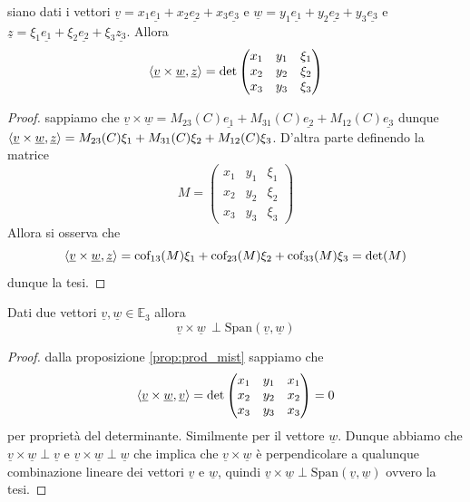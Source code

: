 %
%
\vspace{0.5cm}
\begin{prop}[\textcolor{blue}{matrice del prodotto misto}]
siano dati i vettori $\underline{v}=x_1 \underline{e_1} + x_2 \underline{e_2} + x_3 \underline{e_3}$ e $\underline{w} = y_1 \underline{e_1} + y_2 \underline{e_2} + y_3 \underline{e_3}$ e $\underline{z} = \xi_1 \underline{e_1} + \xi_2 \underline{e_2} + \xi_3 \underline{z_3}$. Allora
%
\begin{equation*}
\langle \underline{v} \times \underline{w}, \underline{z} \rangle 
= \text{det}\begin{pmatrix}
	x_1 & y_1 & \xi_1 \\
	x_2 & y_2 & \xi_2 \\
	x_3 & y_3 & \xi_3
\end{pmatrix}
\end{equation*}
\label{prop:prod_mist}
\end{prop}
%
%
\begin{proof}
	sappiamo che $\underline{v} \times \underline{w} = M_{23}(C)\underline{e_1} + M_{31}(C) \underline{e_2} + M_{12}(C) \underline{e_3}$ dunque $\langle \underline{v} \times \underline{w}, \underline{z} \rangle = M_{23}(C)\xi_1 + M_{31}(C)\xi_2 + M_{12}(C)\xi_3$. D'altra parte definendo la matrice 
	\[M=\begin{pmatrix}
		x_1 & y_1 & \xi_1 \\
		x_2 & y_2 & \xi_2 \\
		x_3 & y_3 & \xi_3
	\end{pmatrix}\] 
Allora si osserva che
%
\[\langle \underline{v} \times \underline{w}, \underline{z} \rangle = \text{cof}_{13}(M)\xi_1 + \text{cof}_{23}(M)\xi_2 + \text{cof}_{33}(M) \xi_3 = \text{det}(M)\]
%
dunque la tesi.
\end{proof}
%
\vspace{0.5cm}
\begin{cor}
Dati due vettori $\underline{v}, \underline{w} \in \mathbb{E}_3$ allora
%
\[\underline{v} \times \underline{w} \, \perp \text{Span}(\underline{v}, \underline{w})\]
%
\end{cor}
\begin{proof}
dalla proposizione \ref{prop:prod_mist} sappiamo che
%
\[\langle \underline{v} \times \underline{w}, \underline{v} \rangle 
= \text{det}\begin{pmatrix}
	x_1 & y_1 & x_1 \\
	x_2 & y_2 & x_2 \\
	x_3 & y_3 & x_3
\end{pmatrix} = 0\]
%
per proprietà del determinante. Similmente per il vettore $\underline{w}$. Dunque abbiamo che $\underline{v} \times \underline{w} \perp \underline{v}$ e $\underline{v} \times \underline{w} \perp \underline{w}$ che implica che $\underline{v} \times \underline{w}$ è perpendicolare a qualunque combinazione lineare dei vettori $\underline{v}$ e $\underline{w}$, quindi $\underline{v} \times \underline{w} \perp \text{Span}(\underline{v}, \underline{w})$ ovvero la tesi.
\end{proof}
